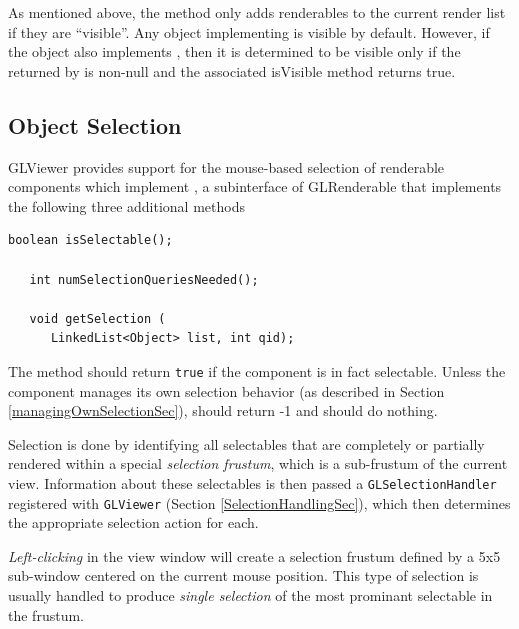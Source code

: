 \documentclass{article}
\begin{document}
As mentioned above, the
 method only
adds renderables to the current render list if they are ``visible''.
Any object implementing  is
visible by default.  However, if the object also implements
, then it is determined to
be visible only if the 
returned by
 is
non-null and the associated isVisible method returns true.

\subsection{Object Selection}

GLViewer provides support for the mouse-based selection of renderable
components which implement , 
a subinterface of
GLRenderable that implements the following three additional methods
\begin{lstlisting}[]
   boolean isSelectable();

   int numSelectionQueriesNeeded();

   void getSelection (
      LinkedList<Object> list, int qid);

\end{lstlisting}
The method  
should return 
{\tt true} if the component is in fact selectable.
Unless the component manages its own selection behavior 
(as described in Section \ref{managingOwnSelectionSec}), 
should return -1
and  should do nothing.

Selection is done by identifying all selectables that are completely
or partially rendered within a special {\it selection frustum}, which
is a sub-frustum of the current view. Information about these
selectables is then passed a {\tt GLSelectionHandler}
registered with {\tt GLViewer} (Section \ref{SelectionHandlingSec}),
which then determines the appropriate selection action for each.


{\it Left-clicking} in the view window will create a selection frustum
defined by a 5x5 sub-window centered on the current mouse
position. This type of selection is usually handled to produce {\it
single selection} of the most prominant selectable in the frustum.
\end{document}
